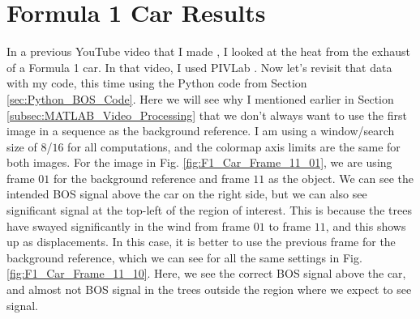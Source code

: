 \documentclass[letterpaper,12pt]{article}
\begin{document}
\section{Formula 1 Car Results}
\label{sec:Formula_1_Car_Results}

In a previous YouTube video that I made \cite{JTE_F1_Car}, I looked at the heat from the exhaust of a Formula 1 car.  In that video, I used PIVLab \cite{2014_Thielicke}.  Now let's revisit that data with my code, this time using the Python code from Section \ref{sec:Python_BOS_Code}.  Here we will see why I mentioned earlier in Section \ref{subsec:MATLAB_Video_Processing} that we don't always want to use the first image in a sequence as the background reference.  I am using a window/search size of $8$/$16$ for all computations, and the colormap axis limits are the same for both images.  For the image in Fig. \ref{fig:F1_Car_Frame_11_01}, we are using frame $01$ for the background reference and frame $11$ as the object.  We can see the intended BOS signal above the car on the right side, but we can also see significant signal at the top-left of the region of interest.  This is because the trees have swayed significantly in the wind from frame $01$ to frame $11$, and this shows up as displacements.  In this case, it is better to use the previous frame for the background reference, which we can see for all the same settings in Fig. \ref{fig:F1_Car_Frame_11_10}.  Here, we see the correct BOS signal above the car, and almost not BOS signal in the trees outside the region where we expect to see signal.
\end{document}
